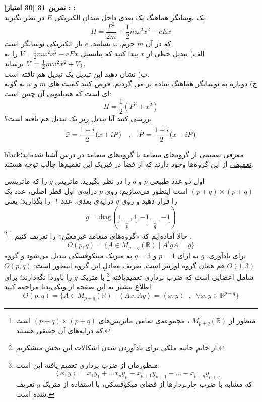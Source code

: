 \documentclass{article}
\newenvironment{exercise}[3][\unskip]{%
	\par
	\noindent
	\textbf{تمرین
		#1
		[#2 امتیاز] 
		\def\temp{#3}\ifx\temp\empty
		: 
		\else
		: #3 \vspace{0.5em} \\ \noindent
		\fi
}}{}
\begin{document}
	\begin{exercise}[31]{30}{}
		یک نوسانگر هماهنگ یک بعدی داخل میدان الکتریکی 
		$E$ 
		در نظر بگیرید.
		\begin{equation*}
			H=\frac{P^2}{2m}+\frac{1}{2}m\omega ^2 x^2 - eEx
		\end{equation*}
		که در آن 
		$m$
		جرم، 
		$\omega$ 
		بسامد، 
		$e$ 
		بار الکتریکی نوسانگر است.
		\\
		الف) تبدیل خطی از 
		$x$ 
		پیدا کنید که پتانسیل 
		$V=\frac{1}{2}m\omega ^2 x^2 - eEx$ 
		را به 
		$\Tilde{V}=\frac{1}{2}m\omega ^2 \Tilde{x}^2 +V_0$ 
		برساند.\\
		ب) نشان دهید این تبدیل یک تبدیل هم تافته 
		است.\\
		ج) دوباره به نوسانگر هماهنگ ساده بر می گردیم. فرض کنید کمیت های 
		$m$ 
		و 
		$\omega$ 
		به گونه ای است که همیلتونی آن چنین است:
		\begin{equation*}
			H=\frac{1}{2}(P^2+x^2)
		\end{equation*}
		بررسی کنید آیا تبدیل زیر یک تبدیل هم تافته است؟
		\begin{equation*}
			\Tilde{x}=\frac{1+i}{2}(x+iP) \quad , \quad \Tilde{P}=\frac{1+i}{2}(x-iP)
		\end{equation*}
	\end{exercise}
	
	\begin{boxes}{black}{معرفی تعمیمی از گروه‌های متعامد}
		با گروه‌های متعامد
		در درس آشنا شده‌اید؛ 
		\href{https://en.wikipedia.org/wiki/Indefinite_orthogonal_group}{تعمیمی}
		از این گروه‌ها وجود دارند که از قضا در فیزیک این تعمیم‌ها جالب توجه هستند.
		
		اول دو عدد طبیعی $p$ و $q$ را در نظر بگیرید. ماتریس $g$ را که ماتریسی 
		$(p+q) \times (p+q)$
		است اینطور می‌سازیم: روی $p$ درایه‌ی اول قطر اصلی، عدد یک را قرار دهید و روی $q$ درایه‌ی بعدی، عدد ۱- را بگذارید؛ یعنی 
		\[
		g = \text{diag} (\underbrace{1,\dots,1}_{p},\underbrace{-1,\dots,-1}_{q})
		\]
		حالا آماده‌ایم که «گروه‌های متعامد غیرمعیّن» را تعریف کنیم
		\footnote{منظور از 
			$M_{p+q}(\mathbb{R})$
			، مجموعه‌ی تمامی ماتریس‌های 
			$(p+q) \times (p+q)$
			است که درایه‌های آن حقیقی هستند.
		}
		\footnote{از خانم حانیه ملکی برای یادآوردن شدن اشکالات این بخش متشکریم.}
		.
		\[
		O(p,q) = \{
		A \in M_{p+q}(\mathbb{R}) \; \big| \; A^t g A = g 
		\}
		\]
		برای یادآوری، $g$ به ازای $p=1$ و $q=3$ به متریک مینکوفسکی
		تبدیل می‌شود و گروه 
		$O(1,3)$ 
		هم همان گروه لورنتز است. تعریف معادلِ این گروه اینطور است:  $O(p,q)$ شامل اعضایی است که ضرب برداری تعمیم‌یافته
		\footnote{
			منظورمان از ضرب برداری تعمیم یافته این است:
			\[
			\left< x,y \right> = x_1y_1 + \dots x_py_p - x_{p+1}y_{p+1} -\dots - x_{p+q} y_{p+q}
			\]
			که مشابه با ضرب چاربردارها از فضای میکوفسکی، با استفاده از متریک $g$ تعریف شده است.
		}
		با متریک $g$ را ناوردا نگه‌دارند؛ برای اطلاع بیشتر به 
		\href{https://en.wikipedia.org/wiki/Indefinite_orthogonal_group}{این صفحه از ویکی‌پدیا}
		مراجعه کنید.
		\[
		O(p,q) = \{
		A \in M_{p+q}(\mathbb{R}) \; \big| \; \left< Ax,Ay \right> = \left< x,y \right> \;\; , \;\; \forall x,y \in \mathbb{R}^{p+q}
		\}
		\]
	\end{boxes}
	
	
	\vspace{1em}
\end{document}
